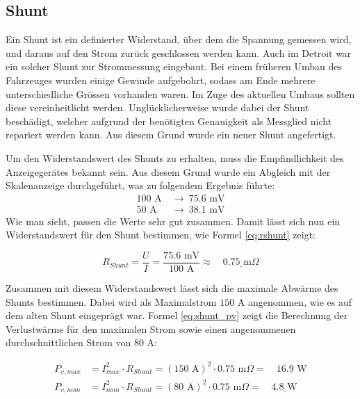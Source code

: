 \subsection{Shunt}
Ein Shunt ist ein definierter Widerstand, über dem die Spannung gemessen wird, und daraus auf den Strom zurück geschlossen werden kann. Auch im Detroit war ein solcher Shunt zur Strommessung eingebaut. Bei einem früheren Umbau des Fahrzeuges wurden einige Gewinde aufgebohrt, sodass am Ende mehrere unterschiedliche Grössen vorhanden waren. Im Zuge des aktuellen Umbaus sollten diese vereinheitlicht werden. Unglücklicherweise wurde dabei der Shunt beschädigt, welcher aufgrund der benötigten Genauigkeit als Messglied nicht repariert werden kann. Aus diesem Grund wurde ein neuer Shunt angefertigt.

Um den Widerstandswert des Shunts zu erhalten, muss die Empfindlichkeit des Anzeigegerätes bekannt sein. Aus diesem Grund wurde ein Abgleich mit der Skalenanzeige durchgeführt, was zu folgendem Ergebnis führte:
\begin{equation*}\begin{aligned}
	100\text{ A}\ &\rightarrow\ 75.6\text{ mV}\\
	50\text{ A}\ &\rightarrow\ 38.1\text{ mV}
\end{aligned}\end{equation*}
Wie man sieht, passen die Werte sehr gut zusammen. Damit lässt sich nun ein Widerstandswert für den Shunt bestimmen, wie Formel \ref{eq:rshunt} zeigt:

\begin{equation}
R_{Shunt}=\frac{U}{I}=\frac{75.6\text{ mV}}{100\text{ A}}\approx\quad\underline{0.75\text{ m}\Omega}
\label{eq:rshunt}
\end{equation}

Zusammen mit diesem Widerstandswert lässt sich die maximale Abwärme des Shunts bestimmen. Dabei wird als Maximalstrom $150$ A angenommen, wie es auf dem alten Shunt eingeprägt war. Formel \ref{eq:shunt_pv} zeigt die Berechnung der Verlustwärme für den maximalen Strom sowie einen angenommenen durchschnittlichen Strom von $80$ A:

\begin{equation}\begin{aligned}
	P_{v,max}&=I_{max}^2\cdot R_{Shunt}=\left(150\text{ A}\right)^2\cdot0.75\text{ m}\Omega=\quad\underline{16.9\text{ W}}\\[6pt]
	P_{v,nom}&=I_{nom}^2\cdot R_{Shunt}=\left(80\text{ A}\right)^2\cdot0.75\text{ m}\Omega=\quad\underline{4.8 \text{ W}}
\label{eq:shunt_pv}
\end{aligned}\end{equation}

